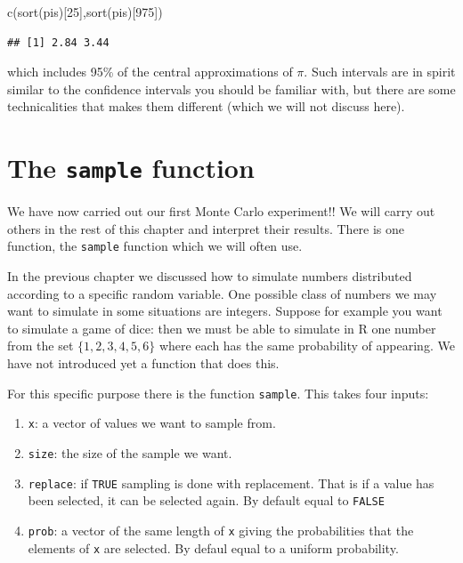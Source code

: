 \documentclass[
]{book}
\newenvironment{Shaded}{\begin{snugshade}}{\end{snugshade}}
\newcommand{\DecValTok}[1]{\textcolor[rgb]{0.00,0.00,0.81}{#1}}
\newcommand{\FunctionTok}[1]{\textcolor[rgb]{0.00,0.00,0.00}{#1}}
\newcommand{\NormalTok}[1]{#1}
\theoremstyle{definition}
\theoremstyle{definition}
\theoremstyle{definition}
\theoremstyle{definition}
\theoremstyle{remark}
\begin{document}
\begin{Shaded}
\begin{Highlighting}[]
\FunctionTok{c}\NormalTok{(}\FunctionTok{sort}\NormalTok{(pis)[}\DecValTok{25}\NormalTok{],}\FunctionTok{sort}\NormalTok{(pis)[}\DecValTok{975}\NormalTok{])}
\end{Highlighting}
\end{Shaded}

\begin{verbatim}
## [1] 2.84 3.44
\end{verbatim}

which includes 95\% of the central approximations of \(\pi\). Such intervals are in spirit similar to the confidence intervals you should be familiar with, but there are some technicalities that makes them different (which we will not discuss here).

\hypertarget{the-sample-function}{%
\section{\texorpdfstring{The \texttt{sample} function}{The sample function}}\label{the-sample-function}}

We have now carried out our first Monte Carlo experiment!! We will carry out others in the rest of this chapter and interpret their results. There is one function, the \texttt{sample} function which we will often use.

In the previous chapter we discussed how to simulate numbers distributed according to a specific random variable. One possible class of numbers we may want to simulate in some situations are integers. Suppose for example you want to simulate a game of dice: then we must be able to simulate in R one number from the set \(\{1,2,3,4,5,6\}\) where each has the same probability of appearing. We have not introduced yet a function that does this.

For this specific purpose there is the function \texttt{sample}. This takes four inputs:

\begin{enumerate}
\def\labelenumi{\arabic{enumi}.}
\item
  \texttt{x}: a vector of values we want to sample from.
\item
  \texttt{size}: the size of the sample we want.
\item
  \texttt{replace}: if \texttt{TRUE} sampling is done with replacement. That is if a value has been selected, it can be selected again. By default equal to \texttt{FALSE}
\item
  \texttt{prob}: a vector of the same length of \texttt{x} giving the probabilities that the elements of \texttt{x} are selected. By defaul equal to a uniform probability.
\end{enumerate}
\end{document}
